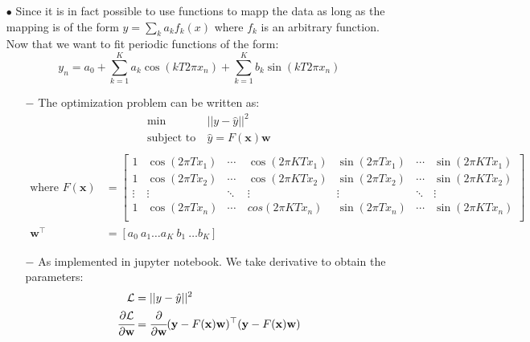 \documentclass[11pt]{article}
\begin{document}
\begin{itemize}
\item[$\bullet$]Since it is in fact possible to use functions to mapp the data as long as the mapping is of the form $y = \sum_{k} a_k f_k(x)$ where $f_k$ is an arbitrary function. Now that we want to fit periodic functions of the form:
\begin{equation}
 y_n  = a_0 + \sum_{k=1}^{K}a_k \cos(kT2\pi x_n) + \sum_{k=1}^{K}b_k \sin(kT2\pi x_n) \nonumber
\end{equation}
\begin{itemize}
\item[$-$] The optimization problem can be written as:
\begin{equation}
\begin{aligned}
\min & \  || y - \hat{y}||^2 \\ \nonumber
\text{subject to} & \ \hat{y} = F(\textbf{x})\textbf{w} \\ 
\end{aligned}
\end{equation}
\begin{equation}
\begin{aligned}
\text{where }  F(\textbf{x})& =  \left[\begin{matrix}
1  &  \cos(2\pi T x_1)  & \cdots\ &\cos(2\pi KT x_1) &\sin(2\pi T x_1)& \cdots &\sin(2\pi KT x_1)\\
1  &  \cos(2\pi T x_2)  & \cdots\ & \cos(2\pi KT x_2)  &\sin(2\pi T x_2)&\cdots &\sin(2\pi KT x_2)\\ 
\vdots   & \vdots & \ddots  & \vdots  & \vdots & \ddots & \vdots \\
1 &  \cos(2\pi T x_n)  & \cdots\  & cos(2\pi KT x_n) &\sin(2\pi T x_n)& \cdots &\sin(2\pi KT x_n)\\
\end{matrix} \right]\nonumber \\
\textbf{w}^{\top} &= \left[a_0 \  a_1 \ldots a_K \  b_1 \ \ldots b_K\right]  \nonumber 
\end{aligned}
\end{equation}
\item[$-$] As implemented in jupyter notebook. We take derivative to obtain the parameters:
\begin{equation}
\begin{aligned}
\mathcal{L} &= ||y - \hat{y} ||^2 \nonumber \\
\cfrac{\partial \mathcal{L}}{\partial {\textbf{w}}} &= \cfrac{\partial }{\partial {\textbf{w}}} (\textbf{y} - F(\textbf{x}) \textbf{w})^{\top}(\textbf{y} - F(\textbf{x}) \textbf{w})\nonumber \\

\end{aligned}
\end{equation}
\end{itemize}
\end{itemize}
\end{document}
